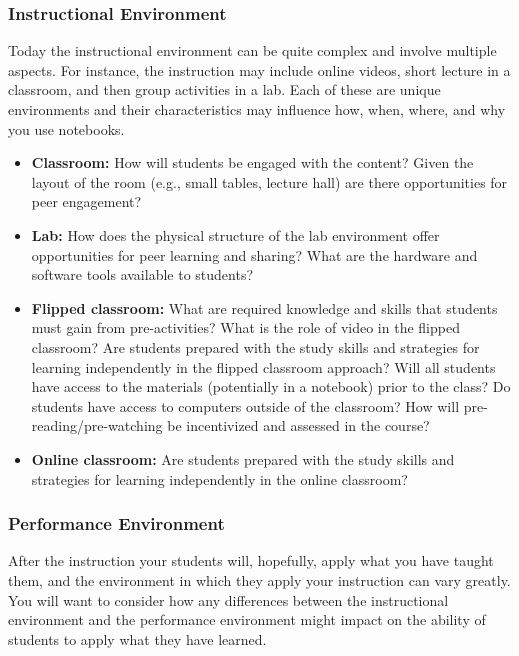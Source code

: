 \documentclass[]{book}
\providecommand{\tightlist}{%
  \setlength{\itemsep}{0pt}\setlength{\parskip}{0pt}}
\begin{document}
\hypertarget{instructional-environment}{%
\subsubsection{Instructional Environment}\label{instructional-environment}}

Today the instructional environment can be quite complex and involve multiple
aspects. For instance, the instruction may include online videos, short lecture
in a classroom, and then group activities in a lab. Each of these are unique
environments and their characteristics may influence how, when, where, and why
you use notebooks.

\begin{itemize}
\tightlist
\item
  \textbf{Classroom:} How will students be engaged with the content? Given the
  layout of the room (e.g., small tables, lecture hall) are there
  opportunities for peer engagement?
\item
  \textbf{Lab:} How does the physical structure of the lab environment offer
  opportunities for peer learning and sharing? What are the hardware and
  software tools available to students?
\item
  \textbf{Flipped classroom:} What are required knowledge and skills that students
  must gain from pre-activities? What is the role of video in the flipped
  classroom? Are students prepared with the study skills and strategies for
  learning independently in the flipped classroom approach? Will all students
  have access to the materials (potentially in a notebook) prior to the class?
  Do students have access to computers outside of the classroom? How will
  pre-reading/pre-watching be incentivized and assessed in the course?
\item
  \textbf{Online classroom:} Are students prepared with the study skills and
  strategies for learning independently in the online classroom?
\end{itemize}

\hypertarget{performance-environment}{%
\subsubsection{Performance Environment}\label{performance-environment}}

After the instruction your students will, hopefully, apply what you have taught
them, and the environment in which they apply your instruction can vary greatly.
You will want to consider how any differences between the instructional
environment and the performance environment might impact on the ability of
students to apply what they have learned.
\end{document}
